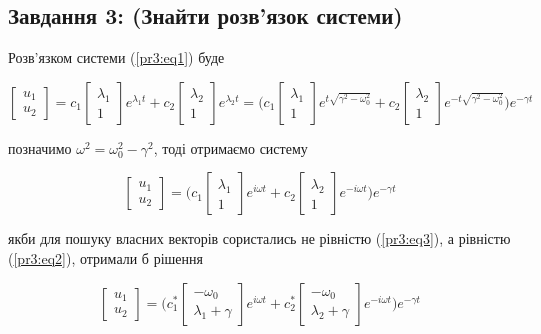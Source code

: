 \subsection{Завдання 3: (Знайти розв'язок системи)}

Розв'язком системи (\ref{pr3:eq1}) буде 

$$
    \begin{bmatrix}
        u_1 \\ u_2
    \end{bmatrix} = 
    c_1 \begin{bmatrix}
        \lambda_1 \\1
    \end{bmatrix} e^{\lambda_1 t} + 
    c_2 \begin{bmatrix}
        \lambda_2 \\1
    \end{bmatrix} e^{\lambda_2 t} = \Bigg(
    c_1 \begin{bmatrix}
        \lambda_1 \\1
    \end{bmatrix} e^{t\sqrt{\gamma^2 - \omega_0^2}} + 
    c_2 \begin{bmatrix}
        \lambda_2 \\1
    \end{bmatrix} e^{-t\sqrt{\gamma^2 - \omega_0^2}} \Bigg) e^{-\gamma t}
$$

позначимо $\omega^2 = \omega_0^2 - \gamma^2$, тоді отримаємо систему

\begin{equation}\label{pr3:solution}
    \begin{bmatrix}
        u_1 \\ u_2
    \end{bmatrix} =  \Bigg(
    c_1 \begin{bmatrix}
        \lambda_1 \\1
    \end{bmatrix} e^{i\omega t} + 
    c_2 \begin{bmatrix}
        \lambda_2 \\1
    \end{bmatrix} e^{-i\omega t} \Bigg) e^{-\gamma t}
\end{equation}



якби для пошуку власних векторів сористались не рівністю (\ref{pr3:eq3}), а рівністю
(\ref{pr3:eq2}), отримали б рішення

$$
\begin{bmatrix}
    u_1 \\ u_2
\end{bmatrix} =  \Bigg(
c_1^* \begin{bmatrix}
    -\omega_0 \\ \lambda_1 + \gamma
\end{bmatrix} e^{i\omega t} + 
c_2^* \begin{bmatrix}
    -\omega_0 \\\lambda_2 + \gamma
\end{bmatrix} e^{-i\omega t} \Bigg) e^{-\gamma t}
$$